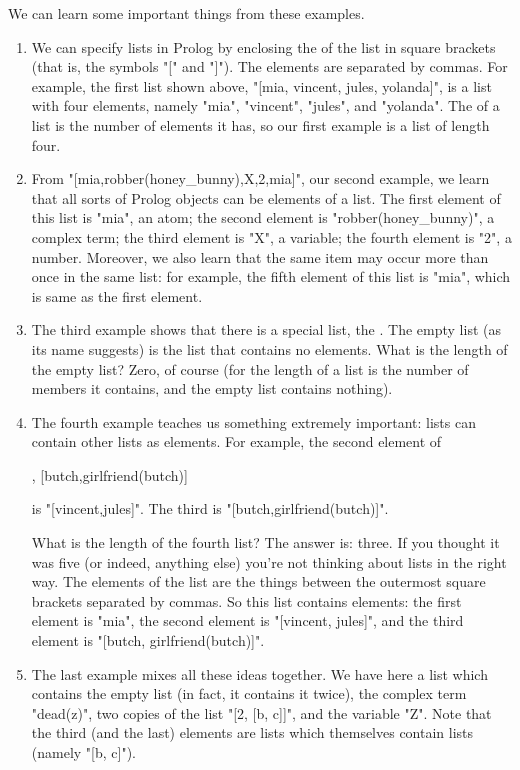 We can learn some important things from these examples.
\begin{enumerate}
\item{}We can specify lists in Prolog by enclosing the
 of the list in square brackets (that is, the symbols
"[" and "]").  The elements are separated by commas.  For example, the
first list shown above, "[mia, vincent, jules, yolanda]", is a list with
four elements, namely "mia", "vincent", "jules", and "yolanda".  The
 of a list is the number of elements it has, so our
first example is a list of length four.
\item{}From "[mia,robber(honey\_bunny),X,2,mia]",
our second example,
we learn that all sorts of Prolog
objects can be elements of a list.  The first element of this list is
"mia", an atom; the second element is "robber(honey\_bunny)",
a complex term; the third element is "X", a variable; the fourth
element is "2", a number.  Moreover, we also learn that the same
item may occur more than once in the same list: for example, the fifth
element of this list is "mia", which is same as the first
element.
\item{}The third example shows that there is a special list,
        the .  The empty list (as its name
        suggests) is the list that contains no elements.  What is the
        length of the empty list?  Zero, of course (for the length of a
        list is the number of members it contains, and the empty list
        contains nothing).
\item{}The fourth example teaches us something extremely important:
        lists can contain other lists as elements.  For example, the
        second element of
        \begin{LPNcodedisplay}
[mia, [vincent, jules], [butch,girlfriend(butch)]
\end{LPNcodedisplay}
 is
        "[vincent,jules]". The
        third is "[butch,girlfriend(butch)]".

        What is the length of the fourth list?  The answer is: three.
If you thought it was five (or indeed, anything else) you're not
thinking about lists in the right way.  The elements of the list are
the things between the outermost square brackets separated by commas.
So this list contains  elements: the first element is
"mia", the second element is "[vincent, jules]", and the
third element is "[butch, girlfriend(butch)]".
\item{}The last example mixes all these ideas together.  We have
        here a list which contains the empty list (in fact, it contains it
        twice), the complex term "dead(z)", two copies of the list
        "[2, [b, c]]", and the variable "Z".  Note that
        the third (and the last) elements are lists which themselves
        contain lists (namely "[b, c]").
\end{enumerate}


